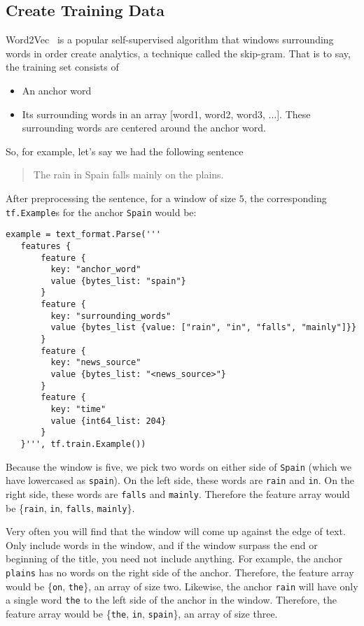 \documentclass[paper=a4, fontsize=11pt]{scrartcl} %
\begin{document}
\subsection{Create Training Data}

Word2Vec~\cite{word2vec} is a popular self-supervised algorithm that windows surrounding words in order create analytics, a technique called the skip-gram. That is to say, the training set consists of 

\begin{itemize}
    \item An anchor word
    \item Its surrounding words in an array [word1, word2, word3, ...]. These surrounding words are centered around the anchor word.
\end{itemize}

So, for example, let's say we had the following sentence

\vspace*{\fill} 
\begin{quote} 
\centering 
The rain in Spain falls mainly on the plains.
\end{quote}
\vspace*{\fill}

After preprocessing the sentence, for a window of size $5$, the corresponding \verb"tf.Example"s for the anchor \verb"Spain" would be:

\begin{verbatim}
example = text_format.Parse('''
   features {
       feature {
         key: "anchor_word"
         value {bytes_list: "spain"}
       }
       feature {
         key: "surrounding_words"
         value {bytes_list {value: ["rain", "in", "falls", "mainly"]}}
       }
       feature {
         key: "news_source"
         value {bytes_list: "<news_source>"}
       }
       feature {
         key: "time"
         value {int64_list: 204}
       }
   }''', tf.train.Example())
\end{verbatim}

Because the window is five, we pick two words on either side of \verb"Spain" (which we have lowercased as \verb"spain"). On the left side, these words are \verb"rain" and \verb"in". On the right side, these words are \verb"falls" and \verb"mainly". Therefore the feature array would be \{\verb"rain", \verb"in", \verb"falls", \verb"mainly"\}.

Very often you will find that the window will come up against the edge of text. Only include words in the window, and if the window surpass the end or beginning of the title, you need not include anything. For example, the anchor \verb"plains" has no words on the right side of the anchor. Therefore, the feature array would be \{\verb"on", \verb"the"\}, an array of size two. Likewise, the anchor \verb"rain" will have only a single word \verb"the" to the left side of the anchor in the window. Therefore, the feature array would be \{\verb"the", \verb"in", \verb"spain"\}, an array of size three.
\end{document}
